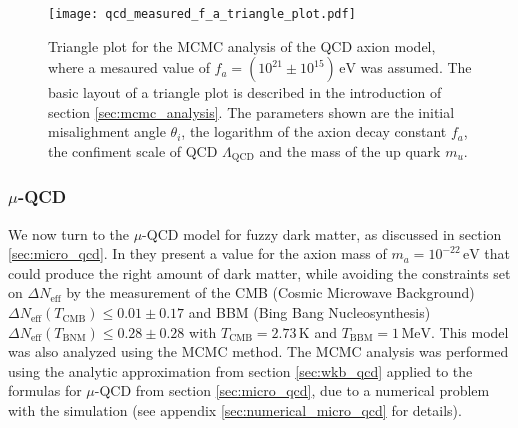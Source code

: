\documentclass[twoside,a4paper, 12pt]{article}
\numberwithin{equation}{section}
\begin{document}
\begin{figure}[H]
    \centering
    \texttt{[image: qcd\_measured\_f\_a\_triangle\_plot.pdf]}
    \caption{Triangle plot for the MCMC analysis of the QCD axion model, where
    a mesaured value of $f_a = (10^{21} \pm 10^{15}) \, \mathrm{eV}$ was assumed.
    The basic layout of a triangle plot is described in the introduction of section \ref{sec:mcmc_analysis}.
    The parameters shown are the initial misalighment angle $\theta_i$, the logarithm
    of the axion decay constant $f_a$, the confiment scale of QCD $\Lambda_\mathrm{QCD}$
    and the mass of the up quark $m_u$.
    }
    \label{fig:qcd_measured_f_a_triangle_plot}
\end{figure}



\subsubsection{$\mu$-QCD}
We now turn to the $\mu$-QCD model for fuzzy dark matter, as discussed in section \ref{sec:micro_qcd}.
In \cite{microqcd} they present a value for the axion mass of $m_a = 10^{-22} \, \mathrm{eV}$ that could produce the right amount of dark matter, while avoiding
the constraints set on $\Delta N_\mathrm{eff}$ by the measurement of the CMB (Cosmic Microwave Background)
$\Delta N_\mathrm{eff}(T_\mathrm{CMB}) \leq 0.01 \pm 0.17$ \cite{Planck} and
BBM (Bing Bang Nucleosynthesis) $\Delta N_\mathrm{eff}(T_\mathrm{BNM}) \leq 0.28 \pm 0.28$ \cite{PDG}
with $T_\mathrm{CMB} = 2.73 \, \mathrm{K}$ and $T_\mathrm{BBM} = 1 \, \mathrm{MeV}$.
This model was also analyzed using the MCMC method.
The MCMC analysis was performed using the analytic approximation from section \ref{sec:wkb_qcd} 
applied to the formulas for $\mu$-QCD from section \ref{sec:micro_qcd}, due to a numerical problem with the simulation
(see appendix \ref{sec:numerical_micro_qcd} for details).
\end{document}

